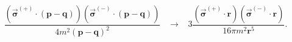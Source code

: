 \begin{equation}
\frac{\left( \overrightarrow{\mathbf{\sigma }}^{\left( +\right) }\cdot
\left( \mathbf{p-q}\right) \right) \left( \overrightarrow{\mathbf{\sigma }}%
^{\left( -\right) }\cdot \left( \mathbf{p-q}\right) \right) }{4m^{2}\left( 
\mathbf{p-q}\right) ^{2}}\;\;\;\rightarrow \;\;\;3\frac{\left( 
\overrightarrow{\mathbf{\sigma }}^{\left( +\right) }\cdot \mathbf{r}\right)
\left( \overrightarrow{\mathbf{\sigma }}^{\left( -\right) }\cdot \mathbf{r}%
\right) }{16\pi m^{2}\mathbf{r}^{5}}.
\end{equation}

